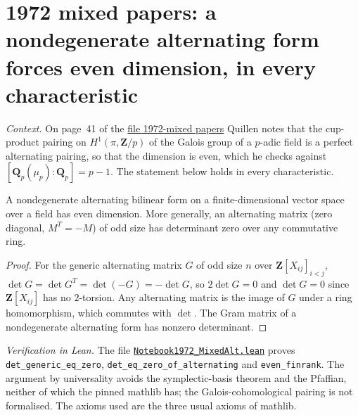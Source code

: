 \section[1972 mixed papers: alternating perfect pairings force even dimension]{1972 mixed papers: a nondegenerate alternating form forces even dimension, in every characteristic\protect{}}\label{sec:quillen-1972-mixed-alt}

\emph{Context.} On page~41 of the \href{https://www.claymath.org/library/Quillen/Working_papers/quillen\%201972/1972-mixed\%20papers.pdf}{file 1972-mixed papers} Quillen notes that the cup-product pairing on $H^1(\pi, \mathbf Z/p)$ of the Galois group of a $p$-adic field is a perfect alternating pairing, so that the dimension is even, which he checks against $[\mathbf Q_p(\mu_p) : \mathbf Q_p] = p - 1$. The statement below holds in every characteristic.

\begin{encadre}
\begin{theoreme}\label{thm:quillen-1972-mixed-alt}
A nondegenerate alternating bilinear form on a finite-dimensional vector space over a field has even dimension. More generally, an alternating matrix (zero diagonal, $M^T = -M$) of odd size has determinant zero over any commutative ring.
\end{theoreme}
\end{encadre}

\begin{proof}
For the generic alternating matrix $G$ of odd size $n$ over $\mathbf Z[X_{ij}]_{i<j}$, $\det G = \det G^T = \det(-G) = -\det G$, so $2\det G = 0$ and $\det G = 0$ since $\mathbf Z[X_{ij}]$ has no $2$-torsion. Any alternating matrix is the image of $G$ under a ring homomorphism, which commutes with $\det$. The Gram matrix of a nondegenerate alternating form has nonzero determinant.
\end{proof}

\emph{Verification in Lean.} The file \href{\leanblobmain/Notebook1972_MixedAlt.lean}{\texttt{Notebook1972\_MixedAlt.\allowbreak{}lean}} proves \texttt{det\_generic\_eq\_zero}, \texttt{det\_eq\_zero\_of\_alternating} and \texttt{even\_finrank}. The argument by universality avoids the symplectic-basis theorem and the Pfaffian, neither of which the pinned mathlib has; the Galois-cohomological pairing is not formalised. The axioms used are the three usual axioms of mathlib.

